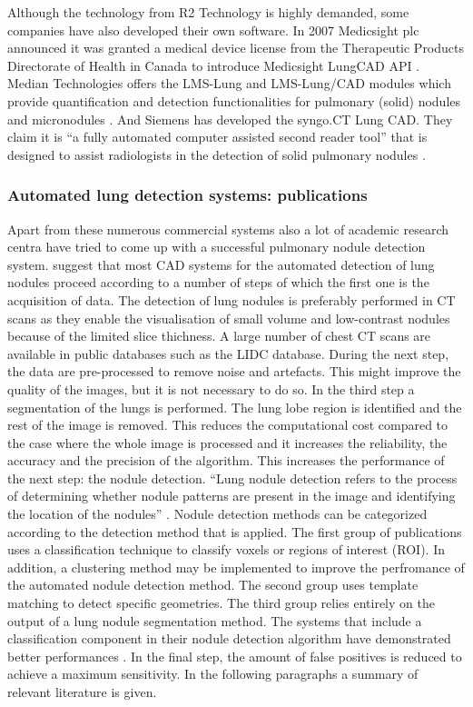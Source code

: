 Although the technology from R2 Technology is highly demanded, some companies
have also developed their own software. In 2007 Medicsight plc announced it was
granted a medical device license from the Therapeutic Products Directorate of
Health in Canada to introduce Medicsight LungCAD API \cite{HI}.
Median Technologies offers the LMS-Lung and LMS-Lung/CAD modules which provide
quantification and detection functionalities for pulmonary (solid) nodules and
micronodules \cite{median}. And Siemens has developed the syngo.CT Lung CAD.
They claim it is ``a fully automated computer assisted second reader tool'' that
is designed to assist radiologists in the detection of solid pulmonary nodules \cite{siemens}.

\subsubsection{Automated lung detection systems: publications}
Apart from these numerous commercial systems also a lot of academic research
centra have tried to come up with a successful pulmonary nodule detection
system. \cite{review} suggest that most CAD systems for the automated detection
of lung nodules proceed according to a number of steps of which the first one is
the acquisition of data. The detection of lung nodules is preferably performed
in CT scans as they enable the visualisation of small volume and low-contrast
nodules because of the limited slice thichness. A large number of chest CT scans
are available in public databases such as the LIDC database. During the next
step, the data are pre-processed to remove noise and artefacts. This might
improve the quality of the images, but it is not necessary to do so. In the
third step a segmentation of the lungs is performed. The lung lobe region is
identified and the rest of the image is removed. This reduces the computational
cost compared to the case where the whole image is processed and it increases
the reliability, the accuracy and the precision of the algorithm. This
increases the performance of the next step: the nodule detection. ``Lung nodule
detection refers to the process of determining whether nodule patterns are
present in the image and identifying the location of the nodules''
\cite[p.~154]{review}. Nodule detection methods can be categorized according to
the detection method that is applied. The first group of publications uses a
classification technique to classify voxels or regions of interest (ROI). In
addition, a clustering method may be implemented to improve the perfromance of
the automated nodule detection method. The second group uses template matching
to detect specific geometries. The third group relies entirely on the output of
a lung nodule segmentation method. The systems that include a classification
component in their nodule detection algorithm have demonstrated better
performances \cite{review}. In the final step, the amount of false positives is
reduced to achieve a maximum sensitivity. In the following paragraphs a summary
of relevant literature is given.

